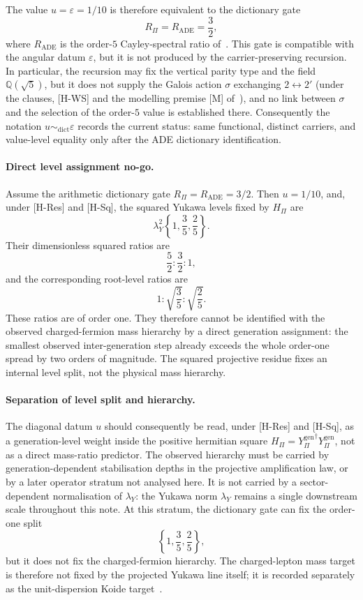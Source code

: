 \documentclass[11pt]{article}
\theoremstyle{definition}
\theoremstyle{remark}
\newcommand{\Ygen}{{Y^{\mathrm{gen}}_{\Pi}}}
\newcommand{\Hpi}{H_{\Pi}}
\newcommand{\lamY}{\lambda_{Y}}
\begin{document}
      The value \(u=\varepsilon=1/10\) is therefore equivalent to the dictionary gate
      \[
        R_\Pi = R_{\mathrm{ADE}}=\frac32,
      \]
      where \(R_{\mathrm{ADE}}\) is the order-\(5\) Cayley-spectral ratio of~\cite{Beau2026a6, Beau2026a4}.
      This gate is compatible with the angular datum \(\varepsilon\), but it is not produced by the
      carrier-preserving recursion.
      In particular, the recursion may fix the vertical parity type and the field
      \(\mathbb{Q}(\sqrt5)\), but it does not supply the Galois action \(\sigma\) exchanging
      \(2\leftrightarrow 2'\) (under the clauses, [H-WS] and the modelling premise [M] of~\cite{Beau2026aog}), and no link
      between \(\sigma\) and the selection of the order-\(5\) value is established there.
      Consequently the notation \(u\sim_{\mathrm{dict}}\varepsilon\) records the current
      status: same functional, distinct carriers, and value-level equality only after the
      ADE dictionary identification.

    \paragraph{Direct level assignment no-go.}
      Assume the arithmetic dictionary gate \(R_\Pi=R_{\mathrm{ADE}}=3/2\).
      Then \(u=1/10\), and, under [H-Res] and [H-Sq], the squared Yukawa levels fixed by \(\Hpi\) are
      \[
        \lamY^{2}\left\{1,\frac35,\frac25\right\}.
      \]
      Their dimensionless squared ratios are
      \[
        \frac52:\frac32:1,
      \]
      and the corresponding root-level ratios are
      \[
        1:\sqrt{\frac35}:\sqrt{\frac25}.
      \]
      These ratios are of order one.
      They therefore cannot be identified with the observed charged-fermion mass hierarchy by a direct generation
      assignment: the smallest observed inter-generation step already exceeds the whole order-one spread by two orders
      of magnitude.
      The squared projective residue fixes an internal level split, not the physical mass hierarchy.

    \paragraph{Separation of level split and hierarchy.}
      The diagonal datum \(u\) should consequently be read, under [H-Res] and [H-Sq], as a generation-level weight
      inside the positive hermitian square \(\Hpi=\Ygen^{\dagger}\Ygen\), not as a direct mass-ratio predictor.
      The observed hierarchy must be carried by generation-dependent stabilisation depths in the projective
      amplification law, or by a later operator stratum not analysed here.
      It is not carried by a sector-dependent normalisation of \(\lamY\): the Yukawa norm \(\lamY\) remains a single
      downstream scale throughout this note.
      At this stratum, the dictionary gate can fix the order-one split
      \[
        \left\{1,\frac35,\frac25\right\},
      \]
      but it does not fix the charged-fermion hierarchy.
      The charged-lepton mass target is therefore not fixed by the projected Yukawa line itself; it is recorded
      separately as the unit-dispersion Koide target~\cite{Beau2026kud}.
\end{document}
